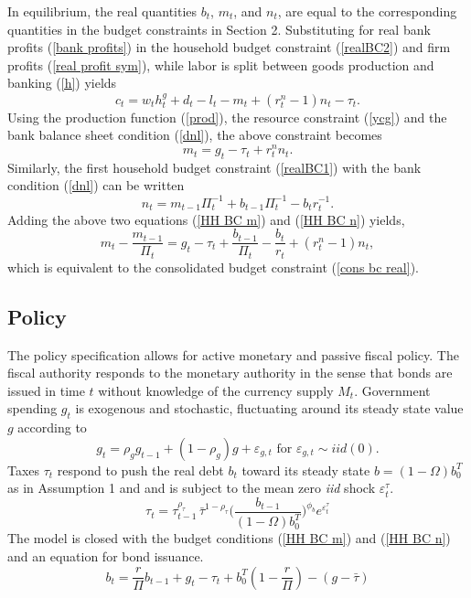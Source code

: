 \documentclass[]{article}
\begin{document}
In equilibrium, the real quantities $b_{t}$, $m_{t}$, and $n_{t}$, are equal to the corresponding quantities in the budget constraints in Section 2. Substituting for real bank profits (\ref{bank profits}) in the household budget constraint (\ref{realBC2}) and firm profits (\ref{real profit sym}), while labor is split between goods production and banking (\ref{h}) yields
\[c_{t}=w_{t}h_{t}^{g}+d_{t}-l_{t}-m_{t}+\left(
r_{t}^{n}-1\right) n_{t}-\tau_{t}.\]
Using the production function (\ref{prod}), the resource constraint (\ref{ycg}) and the bank balance sheet condition (\ref{dnl}), the above constraint becomes
\begin{equation}
    m_{t}=g_{t}-\tau_{t}+r^{n}_{t}n_{t}.
    \label{HH BC m}
\end{equation}
Similarly, the first household budget constraint (\ref{realBC1}) with the bank condition (\ref{dnl}) can be written
\begin{equation}
    n_{t}=m_{t-1}\Pi_{t}^{-1}+b_{t-1}\Pi_{t}^{-1}-b_{t}r_{t}^{-1}.
    \label{HH BC n}
\end{equation}
Adding the above two equations (\ref{HH BC m}) and (\ref{HH BC n}) yields,
\begin{equation} \label{policy BC}
m_{t}-\frac{m_{t-1}}{\Pi_{t}}=g_{t}-\tau_{t}+\frac{b_{t-1}}{\Pi_t}-\frac{b_{t}}{r_{t}}+\left(r_{t}^{n}-1\right) n_{t},
\end{equation}
which is equivalent to the consolidated budget constraint (\ref{cons bc real}).

\subsection{Policy}

The policy specification allows for active monetary and passive fiscal policy. The fiscal authority responds to the monetary authority in the sense that bonds are issued in time $t$ without knowledge of the currency supply $M_{t}$. Government spending $g_{t}$ is exogenous and stochastic, fluctuating around its steady state value $g$ according to
\begin{equation}
g_{t}=\rho_{g}g_{t-1}+(1-\rho_{g})g+\varepsilon_{g,t} \text{ for }\varepsilon_{g,t}\sim
iid\left( 0\right).
\label{g}
\end{equation}%
Taxes $\tau_{t}$ respond to push the real debt $b_{t}$ toward its steady state $b=(1-\Omega)b_{0}^{T}$ as in Assumption 1 and \textcite{eusepi2018fiscal} and is subject to the mean zero \textit{iid} shock $\varepsilon^\tau_t$. 
\begin{equation}
   \tau_t = \tau_{t-1}^{\rho_\tau}\,\bar\tau^{1-\rho_\tau}
\Big(\frac{b_{t-1}}{(1-\Omega)b_0^{T}}\Big)^{\phi_b} e^{\varepsilon^\tau_t}
    \label{tau}
\end{equation}
The model is closed with the budget conditions (\ref{HH BC m}) and (\ref{HH BC n}) and an equation for bond issuance.
\begin{equation}
    b_t = \frac{r}{\Pi}b_{t-1} + g_t - \tau_t + b_0^{T}\left(1-\frac{r}{\Pi}\right) - (g-\bar\tau)
    \label{b issue}
\end{equation}
\end{document}
